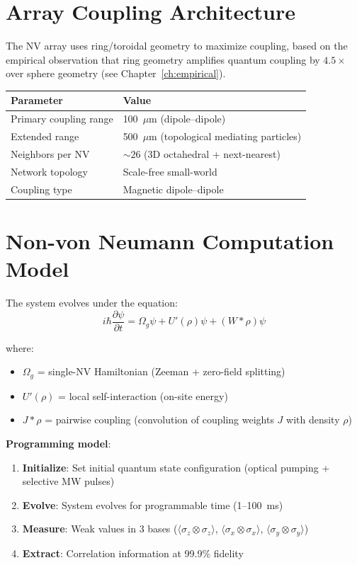 \documentclass[11pt,a4paper,openany]{book}
\begin{document}
\section{Array Coupling Architecture}

The NV array uses ring/toroidal geometry to maximize coupling, based on the empirical observation that ring geometry amplifies quantum coupling by $4.5\times$ over sphere geometry (see Chapter~\ref{ch:empirical}).

\begin{center}
\begin{tabular}{ll}
\toprule
\textbf{Parameter} & \textbf{Value} \\
\midrule
Primary coupling range & 100~$\mu$m (dipole--dipole) \\
Extended range & 500~$\mu$m (topological mediating particles) \\
Neighbors per NV & ${\sim}26$ (3D octahedral + next-nearest) \\
Network topology & Scale-free small-world \\
Coupling type & Magnetic dipole--dipole \\
\bottomrule
\end{tabular}
\end{center}

\section{Non-von Neumann Computation Model}

The system evolves under the equation:
\[
i\hbar \frac{\partial \psi}{\partial t} = \Omega_g \psi + U'(\rho)\psi + (W * \rho)\psi
\]

\noindent
where:
\begin{itemize}[nosep]
  \item $\Omega_g$ = single-NV Hamiltonian (Zeeman + zero-field splitting)
  \item $U'(\rho)$ = local self-interaction (on-site energy)
  \item $J * \rho$ = pairwise coupling (convolution of coupling weights $J$ with density $\rho$)
\end{itemize}

\noindent
\textbf{Programming model}:
\begin{enumerate}[nosep]
  \item \textbf{Initialize}: Set initial quantum state configuration (optical pumping + selective MW pulses)
  \item \textbf{Evolve}: System evolves for programmable time (1--100~ms)
  \item \textbf{Measure}: Weak values in 3 bases ($\langle\sigma_z \otimes \sigma_z\rangle$, $\langle\sigma_x \otimes \sigma_x\rangle$, $\langle\sigma_y \otimes \sigma_y\rangle$)
  \item \textbf{Extract}: Correlation information at 99.9\% fidelity
\end{enumerate}
\end{document}
